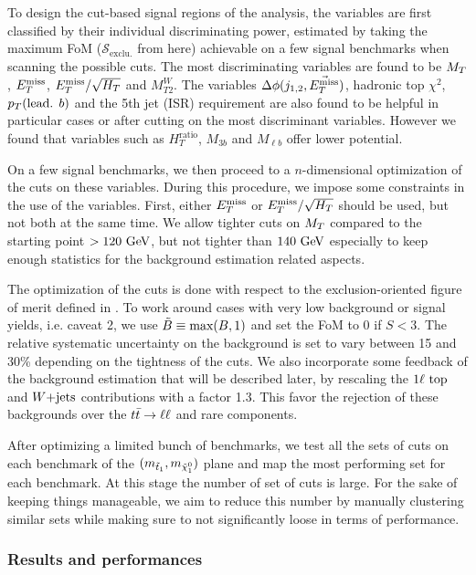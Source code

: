     To design the cut-based signal regions of the analysis, the variables are first
    classified by their individual discriminating power, estimated by taking the
    maximum FoM ($\mathcal{S}_\text{exclu.}$ from  here) achievable on a
    few signal benchmarks when scanning the possible cuts. The most discriminating variables
    are found to be $M_T$, $E_T^\text{miss}$,
    $E_T^\text{miss}/\sqrt{H_T}$ and $M_{T2}^{W}$. The variables $\Delta \phi(j_{1,2},\vec{E_T^\text{miss}})$,
    hadronic top $\chi^2$, $p_T(\text{lead. } b)$ and the 5th jet (ISR) requirement are
    also found to be helpful in particular cases or after cutting on the most discriminant
    variables. However we found that variables such as $H_T^\text{ratio}$, $M_{3b}$ and
    $M_{\ell b}$ offer lower potential.

    On a few signal benchmarks, we then proceed to a $n$-dimensional optimization of the
    cuts on these variables. During this procedure, we impose some constraints in the use of the variables.
    First, either $E_T^\text{miss}$ or $E_T^\text{miss}/\sqrt{H_T}$ should be used, but not both at the same time.
    We allow tighter cuts on $M_T$ compared to the starting point $> 120~\text{GeV}$, but not
    tighter than $140~\text{GeV}$ especially to keep enough statistics for the background
    estimation related aspects.

    The optimization of the cuts is done with respect to the exclusion-oriented figure of
    merit defined in . To work around cases with very low background or signal yields,
    i.e. caveat 2, we use $\tilde{B} \equiv \text{max}(B,1)$ and set the FoM to 0
    if $S < 3$. The relative systematic uncertainty on the background is set to vary between
    15 and 30\% depending on the tightness of the cuts. We also incorporate some feedback
    of the background estimation that will be described later, by rescaling the $1\ell~\text{top}$
    and $\text{$W$+jets}$ contributions with a factor 1.3. This favor the
    rejection of these backgrounds over the $t\bar{t} \rightarrow \ell \ell$ and rare components.

    After optimizing a limited bunch of benchmarks, we test all the sets of cuts on each
    benchmark of the $(m_{\tilde{t}_1},m_{\tilde{\chi}_1^0})$ plane and map the
    most performing set for each benchmark. At this stage the number of set of cuts is
    large. For the sake of keeping things manageable, we aim to reduce this number by
    manually clustering similar sets while making sure to not significantly loose in
    terms of performance.

        \subsubsection{Results and performances \label{sec:cutAndCountPerformances}}

